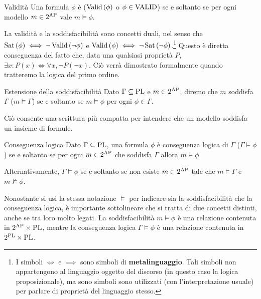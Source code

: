 \begin{definition}{Validità}
  Una formula \(\phi\) è  (\(\Valid[\phi]\) o \(\phi \in \Valid\)) se e soltanto se per ogni modello \(m\in 2^{\AP}\) vale \(m \models \phi\).
\end{definition}

La validità e la soddisfacibilità sono concetti duali, nel senso che \(\Sat[\phi]\iff \neg \Valid[\neg \phi]\) e \(\Valid[\phi] \iff \neg \Sat[\neg \phi]\).\footnote{I simboli \(\iff\) e \(\implies\) sono simboli di \textbf{metalinguaggio}. Tali simboli non appartengono al linguaggio oggetto del discorso (in questo caso la logica proposizionale), ma sono simboli sono utilizzati (con l'interpretazione usuale) per parlare di proprietà del linguaggio stesso.}
Questo è diretta conseguenza del fatto che, data una qualsiasi proprietà \(P\), \(\exists x:P(x) \iff \forall x, \neg P(\neg x)\). Ciò verrà dimostrato formalmente quando tratteremo la logica del primo ordine.

\begin{definition}{Estensione della soddisfacibilità}
  Dato \(\Gamma \subseteq \operatorname{PL}\) e \(m \in 2^{\AP}\), diremo che \(m\) soddisfa \(\Gamma\) (\(m \models \Gamma\)) se e soltanto se \(m \models \phi\) per ogni \(\phi \in \Gamma\).
\end{definition}
Ciò consente una scrittura più compatta per intendere che un modello soddisfa un insieme di formule.

\begin{definition}{Conseguenza logica}
  Dato \(\Gamma \subseteq \operatorname{PL}\), una formula \(\phi\) è conseguenza logica di \(\Gamma\) (\(\Gamma \models \phi\)) se e soltanto se per ogni \(m \in 2^{\AP}\) che soddisfa \(\Gamma\) allora \(m \models \phi\).

  Alternativamente, \(\Gamma \models \phi\) se e soltanto se non esiste \(m \in 2^{\AP}\) tale che \(m \models \Gamma\) e \(m \not\models \phi\).
\end{definition}

\begin{note}{}
  Nonostante si usi la stessa notazione \(\models\) per indicare sia la soddisfacibilità che la conseguenza logica, è importante sottolineare che si tratta di due concetti distinti, anche se tra loro molto legati.
  La soddisfacibilità \(m \models \phi\) è una relazione contenuta in \(2^{\AP}\times \PL\), mentre la conseguenza logica \(\Gamma \models \phi\) è una relazione contenuta in \(2^{\operatorname{PL}}\times \operatorname{PL}\).
\end{note}

